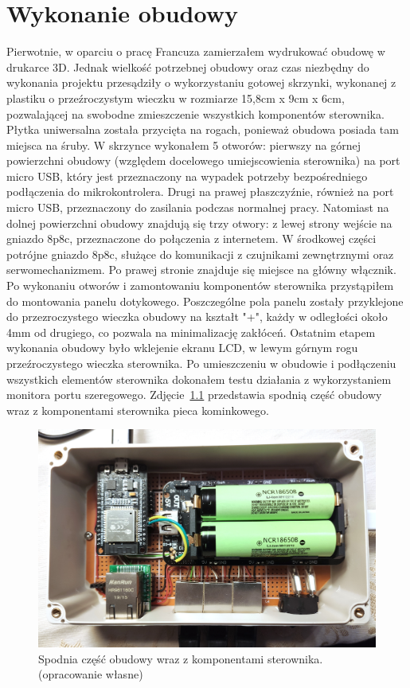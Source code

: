 \documentclass[11pt]{report}
\begin{document}
 \chapter{Wykonanie obudowy}\label{ch:obudowa}
 Pierwotnie, w oparciu o pracę Francuza \cite{Frence2014} zamierzałem wydrukować obudowę w  drukarce 3D. Jednak wielkość potrzebnej obudowy oraz czas niezbędny do wykonania projektu przesądziły o wykorzystaniu gotowej skrzynki, wykonanej z plastiku o przeźroczystym wieczku w rozmiarze 15,8cm x 9cm x 6cm, pozwalającej na swobodne zmieszczenie wszystkich komponentów sterownika. Płytka uniwersalna została przycięta na rogach, ponieważ obudowa posiada tam miejsca na śruby. W skrzynce wykonałem 5 otworów: pierwszy na górnej powierzchni obudowy (względem docelowego umiejscowienia sterownika) na port micro USB, który jest przeznaczony na wypadek potrzeby bezpośredniego podłączenia do mikrokontrolera. Drugi na prawej płaszczyźnie, również na port micro USB, przeznaczony do zasilania podczas normalnej pracy. Natomiast na dolnej powierzchni obudowy znajdują się trzy otwory: z lewej strony wejście na gniazdo 8p8c, przeznaczone do połączenia z internetem. W środkowej części potrójne gniazdo 8p8c, służące do komunikacji z czujnikami zewnętrznymi oraz serwomechanizmem. Po prawej stronie znajduje się miejsce na główny włącznik.
 Po wykonaniu otworów i zamontowaniu komponentów sterownika przystąpiłem do montowania panelu dotykowego. Poszczególne pola panelu zostały przyklejone do przezroczystego wieczka obudowy na kształt "+", każdy w odległości około 4mm od drugiego, co pozwala na minimalizację zakłóceń.
 Ostatnim etapem wykonania obudowy było wklejenie ekranu LCD, w lewym górnym rogu przeźroczystego wieczka sterownika.
 Po umieszczeniu w obudowie i podłączeniu wszystkich elementów sterownika dokonałem testu działania z wykorzystaniem monitora portu szeregowego.
   Zdjęcie~\ref{fig:wnetrze} przedstawia spodnią część obudowy wraz z komponentami sterownika pieca kominkowego.
\begin{figure}[ht]
\centering
\includegraphics[width=0.8 \textwidth]{fig/wnetrze.jpg}
\caption{Spodnia część obudowy wraz z komponentami sterownika. (opracowanie własne)}
\label{fig:wnetrze}
\end{figure}
 
\end{document}

